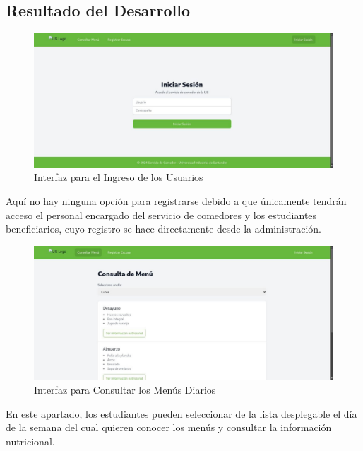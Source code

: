 \documentclass[stu, 12pt, letterpaper, donotrepeattitle, floatsintext, natbib]{apa7}
\begin{document}
\subsection{Resultado del Desarrollo}

\begin{figure}[H]
	\caption[]{Interfaz para el Ingreso de los Usuarios}
	\label{Interfaz para el Ingreso de los Usuarios}
	\includegraphics[width=1\linewidth]{Prototipo/Frontend_01.jpg}
\end{figure}

Aquí no hay ninguna opción para registrarse debido a que únicamente tendrán acceso el personal encargado del servicio de comedores y los estudiantes beneficiarios, cuyo registro se hace directamente desde la administración.

\begin{figure}[H]
	\caption[]{Interfaz para Consultar los Menús Diarios}
	\label{Interfaz para Consultar los Menús Diarios}
	\includegraphics[width=1\linewidth]{Prototipo/Frontend_02.jpg}
\end{figure}

En este apartado, los estudiantes pueden seleccionar de la lista desplegable el día de la semana del cual quieren conocer los menús y consultar la información nutricional.
\end{document}
